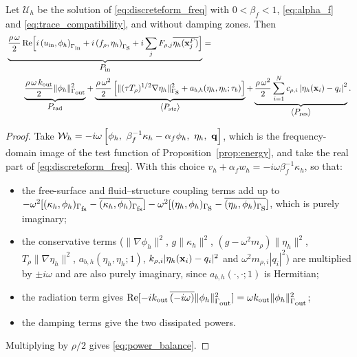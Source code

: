 \begin{corollary}\label{cor:power_balance}
Let $\mathcal{U}_h$ be the solution of \eqref{eq:discreteform_freq} with $0<\beta_f<1$, \eqref{eq:alpha_f} and \eqref{eq:trace_compatibility}, and without damping zones. Then
\begin{align}\label{eq:power_balance}
    &\underbrace{\frac{\rho\,\omega}{2}\,\mathrm{Re}\Big[i\left(u_{\text{\scriptsize in}},\phi_h\right)_{\Gamma_{\mbox{\scriptsize in}}}+i\left(f_\rho,\eta_h\right)_{\Gamma_{\mbox{s}}}+i\sum_jF_{\rho,j}\overline{\eta_h(\mathbf{x}_j^F)}\Big]}_{\displaystyle P_{\mathrm{in}}}
    =\\\nonumber
    &\qquad\underbrace{\frac{\rho\,\omega\,k_{\mathrm{out}}}{2}\|\phi_h\|^2_{\Gamma_{\mbox{\scriptsize out}}}}_{\displaystyle P_{\mathrm{rad}}}
    +\underbrace{\frac{\rho\,\omega^2}{2}\left[\|(\tau T_\rho)^{1/2}\nabla\eta_h\|^2_{\Gamma_{\mbox{s}}}+a_{b,h}(\eta_h,\eta_h;\tau_b)\right]}_{\displaystyle \langle P_{\mbox{\scriptsize str}}\rangle}
    +\underbrace{\frac{\rho\,\omega^2}{2}\sum_{i=1}^Nc_{\rho,i}\left|\eta_h(\mathbf{x}_i)-q_i\right|^2}_{\displaystyle \langle P_{\mbox{\scriptsize res}}\rangle}.
\end{align}
\end{corollary}
\begin{proof}
Take $\mathcal{W}_h=-i\omega\left[\phi_h,\ \beta_f^{-1}\kappa_h-\alpha_f\phi_h,\ \eta_h,\ \qvec\right]$, which is the frequency-domain image of the test function of Proposition~\ref{prop:energy}, and take the real part of \eqref{eq:discreteform_freq}. With this choice $v_h+\alpha_fw_h=-i\omega\beta_f^{-1}\kappa_h$, so that:
\begin{itemize}
    \item the free-surface and fluid--structure coupling terms add up to $-\omega^2[(\kappa_h,\phi_h)_{\Gamma_{\mbox{\scriptsize fs}}}-\overline{(\kappa_h,\phi_h)_{\Gamma_{\mbox{\scriptsize fs}}}}]-\omega^2[(\eta_h,\phi_h)_{\Gamma_{\mbox{s}}}-\overline{(\eta_h,\phi_h)_{\Gamma_{\mbox{s}}}}]$, which is purely imaginary;
    \item the conservative terms ($\|\nabla\phi_h\|^2$, $g\|\kappa_h\|^2$, $(g-\omega^2m_\rho)\|\eta_h\|^2$, $T_\rho\|\nabla\eta_h\|^2$, $a_{b,h}(\eta_h,\eta_h;1)$, $k_{\rho,i}|\eta_h(\mathbf{x}_i)-q_i|^2$ and $\omega^2m_{\rho,i}|q_i|^2$) are multiplied by $\pm i\omega$ and are also purely imaginary, since $a_{b,h}(\cdot,\cdot;1)$ is Hermitian;
    \item the radiation term gives $\mathrm{Re}[-ik_{\mathrm{out}}\,\overline{(-i\omega)}\|\phi_h\|^2_{\Gamma_{\mbox{\scriptsize out}}}]=\omega k_{\mathrm{out}}\|\phi_h\|^2_{\Gamma_{\mbox{\scriptsize out}}}$;
    \item the damping terms give the two dissipated powers.
\end{itemize}
Multiplying by $\rho/2$ gives \eqref{eq:power_balance}.
\end{proof}

